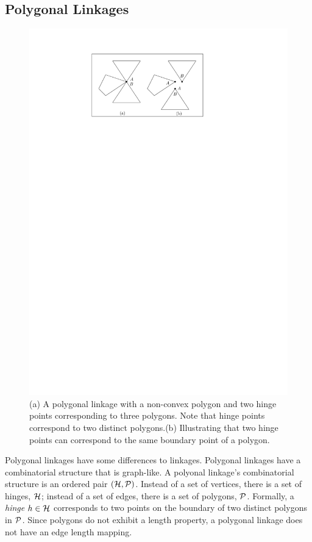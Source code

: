 
\subsection{Polygonal Linkages}
\begin{figure}[h]
\begin{center}
\includegraphics[scale=1]{graphics/hingeOnThreeDistinctPolygons.pdf}
\end{center} 
\caption{(a) A polygonal linkage with a non-convex polygon and two hinge points corresponding to 
three polygons.  Note that hinge points correspond to two distinct polygons.(b) Illustrating that 
two hinge points can correspond to the same boundary point of a polygon.}
\label{fig:linkage-1}
\end{figure}
Polygonal linkages have some differences to linkages.  Polygonal linkages have a combinatorial 
structure that is graph-like.  A polyonal linkage's combinatorial structure is an ordered pair 
$\left({\cal H},{\cal P} \right)$.  Instead of a set of vertices, there is a set of hinges, ${\cal H}$;  instead 
of a set of edges, there is a set of polygons, ${\cal P}$. Formally, a \textit{hinge} $h\in {\cal H}$ 
corresponds to two points on the boundary of two distinct polygons in ${\cal P}$.  Since polygons do not 
exhibit a length property, a polygonal linkage does not have an edge length mapping.  


